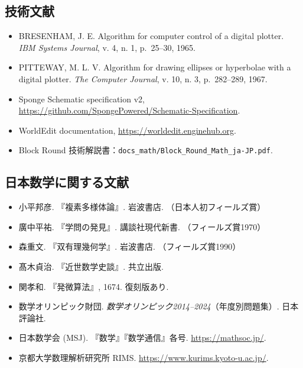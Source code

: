 \documentclass[12pt,a4paper]{scrartcl}
\begin{document}
\subsection{技術文献}
\begin{itemize}[leftmargin=1.3em,itemsep=0.15em,topsep=0.3em]
  \item BRESENHAM, J. E. Algorithm for computer control of a digital plotter. \emph{IBM Systems Journal}, v. 4, n. 1, p.~25--30, 1965.
  \item PITTEWAY, M. L. V. Algorithm for drawing ellipses or hyperbolae with a digital plotter. \emph{The Computer Journal}, v. 10, n. 3, p.~282--289, 1967.
  \item Sponge Schematic specification v2, \url{https://github.com/SpongePowered/Schematic-Specification}.
  \item WorldEdit documentation, \url{https://worldedit.enginehub.org}.
  \item Block Round 技術解説書：\texttt{docs\_math/Block\_Round\_Math\_ja-JP.pdf}.
\end{itemize}

\subsection{日本数学に関する文献}
\begin{itemize}[leftmargin=1.3em,itemsep=0.15em,topsep=0.3em]
  \item 小平邦彦. 『複素多様体論』. 岩波書店. （日本人初フィールズ賞）
  \item 廣中平祐. 『学問の発見』. 講談社現代新書. （フィールズ賞1970）
  \item 森重文. 『双有理幾何学』. 岩波書店. （フィールズ賞1990）
  \item 髙木貞治. 『近世数学史談』. 共立出版.
  \item 関孝和. 『発微算法』, 1674. 復刻版あり.
  \item 数学オリンピック財団. \emph{数学オリンピック2014--2024}（年度別問題集）. 日本評論社.
  \item 日本数学会 (MSJ). 『数学』『数学通信』各号. \url{https://mathsoc.jp/}.
  \item 京都大学数理解析研究所 RIMS. \url{https://www.kurims.kyoto-u.ac.jp/}.
\end{itemize}

\newpage
\appendix
\renewcommand{\thesection}{\Alph{section}}
\setcounter{section}{0}
\end{document}
